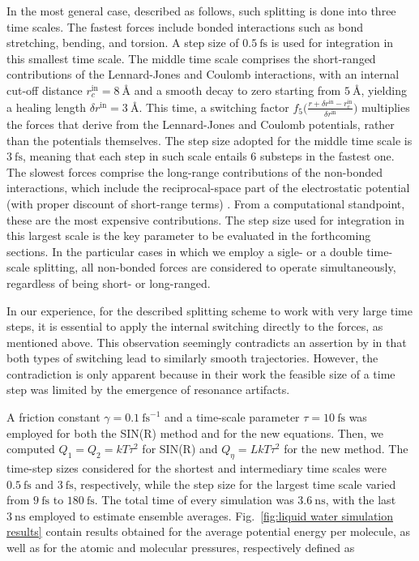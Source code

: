 \documentclass[
aip,
jcp,
reprint,
]{revtex4-1}
\begin{document}
In the most general case, described as follows, such splitting is done into three time scales.
The fastest forces include bonded interactions such as bond stretching, bending, and torsion.
A step size of $0.5~\mathrm{fs}$ is used for integration in this smallest time scale.
The middle time scale comprises the short-ranged contributions of the Lennard-Jones and Coulomb interactions, with an internal cut-off distance $r_c^\mathrm{in} = 8~\text{\AA}$ and a smooth decay to zero starting from $5~\text{\AA}$, yielding a healing length $\delta r^\mathrm{in} = 3~\text{\AA}$.
This time, a switching factor $f_5 \big(\frac{r+\delta r^\mathrm{in}-r_c^\mathrm{in}}{\delta r^\mathrm{in}}\big)$ multiplies the forces that derive from the Lennard-Jones and Coulomb potentials, rather than the potentials themselves.
The step size adopted for the middle time scale is $3~\mathrm{fs}$, meaning that each step in such scale entails $6$ substeps in the fastest one.
The slowest forces comprise the long-range contributions of the non-bonded interactions, which include the reciprocal-space part of the electrostatic potential (with proper discount of short-range terms) \cite{Zhou_2001}.
From a computational standpoint, these are the most expensive contributions.
The step size used for integration in this largest scale is the key parameter to be evaluated in the forthcoming sections.
In the particular cases in which we employ a sigle- or a double time-scale splitting, all non-bonded forces are considered to operate simultaneously, regardless of being short- or long-ranged.

In our experience, for the described splitting scheme to work with very large time steps, it is essential to apply the internal switching directly to the forces, as mentioned above.
This observation seemingly contradicts an assertion by \citeauthor{Morrone_2010} \cite{Morrone_2010} in that both types of switching lead to similarly smooth trajectories.
However, the contradiction is only apparent because in their work the feasible size of a time step was limited by the emergence of resonance artifacts.


A friction constant $\gamma = 0.1~\mathrm{fs}^{-1}$ and a time-scale parameter $\tau = 10~\mathrm{fs}$ was employed for both the SIN(R) method and for the new equations.
Then, we computed $Q_1 = Q_2 = kT \tau^2$ for SIN(R) and $Q_\eta = L kT \tau^2$ for the new method.
The time-step sizes considered for the shortest and intermediary time scales were $0.5~\mathrm{fs}$ and $3~\mathrm{fs}$, respectively, while the step size for the largest time scale varied from $9~\mathrm{fs}$ to $180~\mathrm{fs}$.
The total time of every simulation was $3.6~\mathrm{ns}$, with the last $3~\mathrm{ns}$ employed to estimate ensemble averages.
Fig.~\ref{fig:liquid water simulation results} contain results obtained for the average potential energy per molecule, as well as for the atomic and  molecular pressures, respectively defined as
\end{document}
